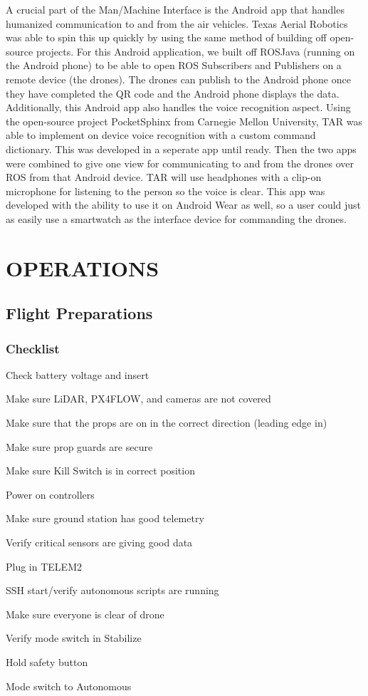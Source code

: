 \documentclass[12pt,letterpaper]{article}
\newenvironment{my_enumerate}{
	\begin{enumerate}
	\setlength{\itemsep}{1pt}
	\setlength{\parskip}{0pt}
	\setlength{\parsep}{0pt}}{\end{enumerate}
}
\begin{document}
		A crucial part of the Man/Machine Interface is the Android app that handles humanized communication to and from the air vehicles. Texas Aerial Robotics was able to spin this up quickly by using the same method of building off open-source projects. For this Android application, we built off ROSJava (running on the Android phone) to be able to open ROS Subscribers and Publishers on a remote device (the drones). The drones can publish to the Android phone once they have completed the QR code and the Android phone displays the data. Additionally, this Android app also handles the voice recognition aspect. Using the open-source project PocketSphinx from Carnegie Mellon University, TAR was able to implement on device voice recognition with a custom command dictionary. This was developed in a seperate app until ready. Then the two apps were combined to give one view for communicating to and from the drones over ROS from that Android device. TAR will use headphones with a clip-on microphone for listening to the person so the voice is clear. This app was developed with the ability to use it on Android Wear as well, so a user could just as easily use a smartwatch as the interface device for commanding the drones. 


\section*{OPERATIONS}
	\subsection*{Flight Preparations}
		\subsubsection*{Checklist}
			\begin{my_enumerate}
				\item Check battery voltage and insert
				\item Make sure LiDAR, PX4FLOW, and cameras are not covered
				\item Make sure that the props are on in the correct direction (leading edge in)
				\item Make sure prop guards are secure
				\item Make sure Kill Switch is in correct position
				\item Power on controllers
				\item Make sure ground station has good telemetry
				\item Verify critical sensors are giving good data
				\item Plug in TELEM2
				\item SSH start/verify autonomous scripts are running
				\item Make sure everyone is clear of drone
				\item Verify mode switch in Stabilize
				\item Hold safety button
				\item Mode switch to Autonomous
			\end{my_enumerate}
\end{document}
